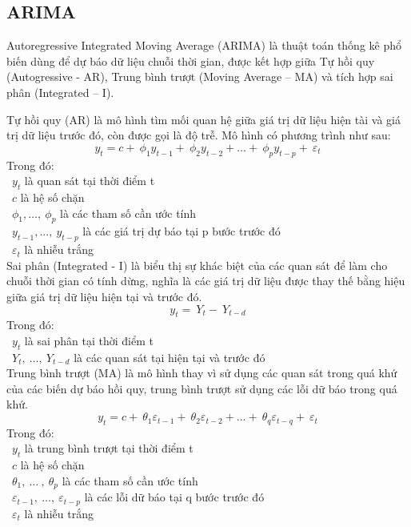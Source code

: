 \subsection{ARIMA}
Autoregressive Integrated Moving Average (ARIMA) là thuật toán thống kê phổ biến dùng để dự báo dữ liệu chuỗi thời gian, được kết hợp giữa Tự hồi quy (Autogressive - AR), Trung bình trượt (Moving Average – MA) và tích hợp sai phân (Integrated – I).
\par
Tự hồi quy (AR) là mô hình tìm mối quan hệ giữa giá trị dữ liệu hiện tài và giá trị dữ liệu trước đó, còn được gọi là độ trễ. Mô hình có phương trình như sau:
\[y_{t} = c + \ \phi_{1}y_{t - 1} + \ \phi_{2}y_{t - 2} + \ldots + \ \phi_{p}y_{t - p} + \ \varepsilon_{t}\]
Trong đó:\\
    \indent\textbullet\ \(y_{t}\) là quan sát tại thời điểm t\\
    \indent\textbullet\ \(c\) là hệ số chặn\\
    \indent\textbullet\ \(\phi_{1},\ldots,\ \phi_{p}\) là các tham số cần ước tính\\
    \indent\textbullet\ \(y_{t - 1},...,\ y_{t - p}\) là các giá trị dự báo tại p bước trước đó\\
    \indent\textbullet\ \(\varepsilon_{t}\) là nhiễu trắng\\

Sai phân (Integrated - I) là biểu thị sự khác biệt của các quan sát để làm cho chuỗi thời gian có tính dừng, nghĩa là các giá trị dữ liệu được thay thế bằng hiệu giữa giá trị dữ liệu hiện tại và trước đó.
\[y_{t} = \ Y_{t} - \ Y_{t - d}\]
Trong đó:\\
    \indent\textbullet\ \(y_{t}\) là sai phân tại thời điểm t\\
    \indent\textbullet\ \(Y_{t},\ \ldots,\ Y_{t - d}\) là các quan sát tại hiện tại và trước đó\\

Trung bình trượt (MA) là mô hình thay vì sử dụng các quan sát trong quá khứ của các biến dự báo hồi quy, trung bình trượt sử dụng các lỗi dữ báo trong quá khứ.
\[y_{t} = c + \ \theta_{1}\varepsilon_{t - 1} + \ \theta_{2}\varepsilon_{t - 2} + \ldots + \ \theta_{q}\varepsilon_{t - q} + \ \varepsilon_{t}\]
Trong đó:\\
    \indent\textbullet\ \(y_{t}\) là trung bình trượt tại thời điểm t\\
    \indent\textbullet\ \(c\) là hệ số chặn\\
    \indent\textbullet\ \(\theta_{1},\ \ldots\ ,\ \theta_{p}\) là các tham số cần ước tính\\
    \indent\textbullet\ \(\varepsilon_{t - 1},\ \ldots,\ \varepsilon_{t - p}\) là các lỗi dữ báo tại q bước trước đó\\
    \indent\textbullet\ \(\varepsilon_{t}\) là nhiễu trắng\\

